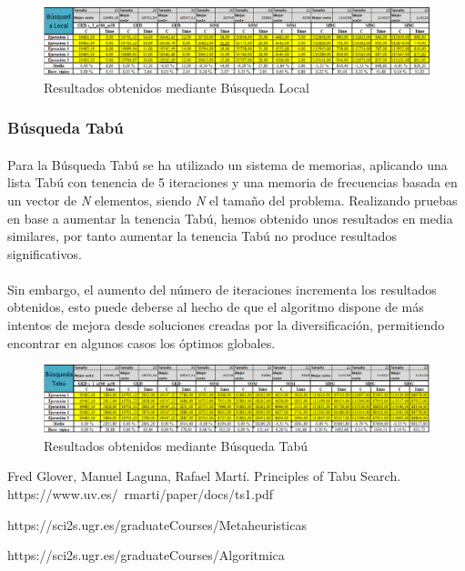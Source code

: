\documentclass{article}
\begin{document}
			\begin{figure}[H]
				
				\centering
				\includegraphics[scale=0.4]{img/blocalResult}
				\caption{Resultados obtenidos mediante Búsqueda Local}
				
			\end{figure}
			
		\subsubsection{Búsqueda Tabú}
	
			\paragraph{}Para la Búsqueda Tabú se ha utilizado un sistema de memorias, aplicando una lista Tabú con tenencia de 5 iteraciones y una memoria de frecuencias basada en un vector de \emph{N} elementos, siendo \emph{N} el tamaño del problema. Realizando pruebas en base a aumentar la tenencia Tabú, hemos obtenido unos resultados en media similares, por tanto aumentar la tenencia Tabú no produce resultados significativos.
			 
			\paragraph{}Sin embargo, el aumento del número de iteraciones incrementa los resultados obtenidos, esto puede deberse al hecho de que el algoritmo dispone de más intentos de mejora desde soluciones creadas por la diversificación, permitiendo encontrar en algunos casos los óptimos globales.
	
			
			\begin{figure}[H]
				
				\centering
				\includegraphics[scale=0.4]{img/btabuResult}
				\caption{Resultados obtenidos mediante Búsqueda Tabú}
				
			\end{figure}
	


	\begin{thebibliography}{0}
		
		 Fred Glover, Manuel Laguna, Rafael Martí. Principles of Tabu Search. https://www.uv.es/~rmarti/paper/docs/ts1.pdf
		
		 https://sci2s.ugr.es/graduateCourses/Metaheuristicas
		
		https://sci2s.ugr.es/graduateCourses/Algoritmica
		
	\end{thebibliography}
\end{document}
